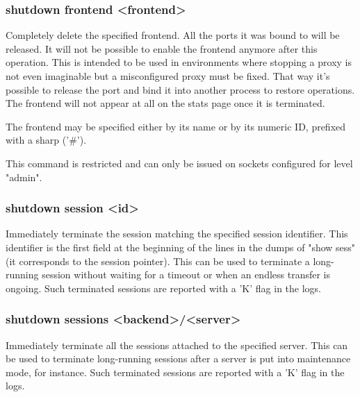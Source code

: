 \subsubsection[shutdown frontend]{shutdown frontend <frontend>}
  Completely delete the specified frontend. All the ports it was bound to will
  be released. It will not be possible to enable the frontend anymore after
  this operation. This is intended to be used in environments where stopping a
  proxy is not even imaginable but a misconfigured proxy must be fixed. That
  way it's possible to release the port and bind it into another process to
  restore operations. The frontend will not appear at all on the stats page
  once it is terminated.

  The frontend may be specified either by its name or by its numeric ID,
  prefixed with a sharp ('\#').

  This command is restricted and can only be issued on sockets configured for
  level "admin".

\subsubsection[shutdown session]{shutdown session <id>}
  Immediately terminate the session matching the specified session identifier.
  This identifier is the first field at the beginning of the lines in the dumps
  of "show sess" (it corresponds to the session pointer). This can be used to
  terminate a long-running session without waiting for a timeout or when an
  endless transfer is ongoing. Such terminated sessions are reported with a 'K'
  flag in the logs.

\subsubsection[shutdown sessions]{shutdown sessions <backend>/<server>}
  Immediately terminate all the sessions attached to the specified server. This
  can be used to terminate long-running sessions after a server is put into
  maintenance mode, for instance. Such terminated sessions are reported with a
  'K' flag in the logs.
